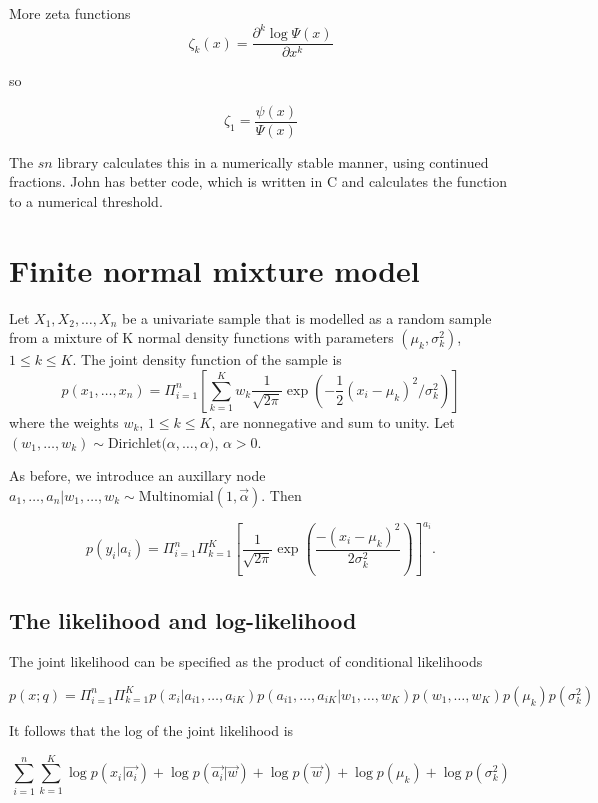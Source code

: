 \documentclass{amsart}
\begin{document}
More zeta functions
\[
\zeta_k(x) = \frac{\partial^k \log{\Psi(x)}}{\partial x^k}
\]

so

\[
\zeta_1 = \frac{\psi(x)}{\Psi(x)}
\]

The $sn$ library calculates this in a numerically stable manner, using continued fractions.
John has better code, which is written in C and calculates the function to a numerical
threshold.

\section{Finite normal mixture model}
Let $X_1, X_2, \ldots, X_n$ be a univariate sample that is modelled as a random sample from a
mixture of K normal density functions with parameters $(\mu_k, \sigma_k^2)$,
$1 \leq k \leq K$. The joint density function of the sample is
\begin{equation}\label{eq:gaussian_mixture}
p(x_1, \ldots, x_n) = \Pi_{i=1}^n \left [ \sum_{k=1}^K w_k \frac{1}{\sqrt{2 \pi}} \exp{ \left( -\frac{1}{2}(x_i - \mu_k)^2/\sigma_k^2 \right)} \right ]
\end{equation}
where the weights $w_k$, $1 \leq k \leq K$, are nonnegative and sum to unity. Let 
$(w_1, \ldots, w_k) \sim \text{Dirichlet($\alpha, \ldots, \alpha$)}$, $\alpha > 0$.


As before, we introduce an auxillary node
$a_1, \ldots, a_n|w_1, \ldots, w_k \sim \text{Multinomial}(1, \vec{\alpha})$. Then

\[
p(y_i|a_i) = \Pi_{i=1}^n \Pi_{k=1}^K \left [ \frac{1}{\sqrt{2 \pi}} \exp{ \left ( \frac{-(x_i - \mu_k)^2}{2 \sigma_k^2} \right )} \right ] ^{a_i}.
\]

\subsection{The likelihood and log-likelihood}
The joint likelihood can be specified as the product of conditional likelihoods

\[
p(x;q) = \Pi_{i=1}^n \Pi_{k=1}^K p(x_i|a_{i1}, \ldots, a_{iK}) p(a_{i1}, \ldots, a_{iK} | w_1, \ldots, w_K) p(w_1, \ldots, w_K) p(\mu_k) p(\sigma_k^2)
\]

It follows that the log of the joint likelihood is

\[
\sum_{i=1}^n \sum_{k=1}^K \log{p(x_i|\vec{a_i})} + \log{p(\vec{a_i}|\vec{w})} + \log{p(\vec{w})} + \log{p(\mu_k)} + \log{p(\sigma_k^2)}
\]
\end{document}
